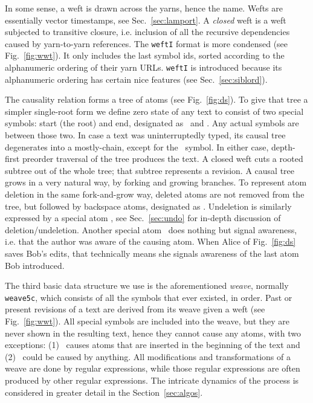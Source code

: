 \documentclass{sig-alternate}
\begin{document}
In some sense, a weft is drawn across the yarns, hence the name.
Wefts are essentially vector timestamps, see Sec.~\ref{sec:lamport}.
A \emph{closed} weft is a weft subjected to transitive closure, i.e. inclusion of all the recursive dependencies caused by yarn-to-yarn references.
The {\tt weftI} format is more condensed (see Fig.~\ref{fig:wwt}). It only includes the last symbol ids, sorted according to the alphanumeric ordering of their yarn URLs.
{\tt weftI} is introduced because its alphanumeric ordering has certain nice features  (see Sec.~\ref{sec:siblord}).

The causality relation forms a tree of atoms (see Fig.~\ref{fig:ds}).
To give that tree a simpler single-root form we define zero state of any text to consist of two special symbols: start (the root) and end, designated as \aum ~and \eoa.
Any actual symbols are between those two.
In case a text was uninterruptedly typed, its causal tree degenerates into a mostly-chain, except for the \eoa ~symbol.
In either case, depth-first preorder traversal of the tree produces the text.
A closed weft cuts a rooted subtree out of the whole tree; that subtree represents a revision.
A causal tree grows in a very natural way, by forking and growing branches.
To represent atom deletion in the same fork-and-grow way, deleted atoms are not removed from the tree, but followed by backspace atoms, designated as \bsp. 
Undeletion is similarly expressed by a special atom \cnc, see Sec.~\ref{sec:undo} for in-depth discussion of deletion/undeletion.
Another special atom \zero ~does nothing but signal awareness, i.e. that the author was aware of the causing atom. When Alice of Fig.~\ref{fig:ds} saves Bob's edits, that technically means she signals awareness of the last atom Bob introduced.

The third basic data structure we use is the aforementioned \emph{weave}, normally {\tt weave5c}, which consists of all the symbols that ever existed, in order. 
Past or present revisions of a text are derived from its weave given a weft (see Fig.~\ref{fig:wwt}).
All special symbols are included into the weave, but they are never shown in the resulting text, hence they cannot cause any atoms, with two exceptions: (1) \aum ~causes atoms that are inserted in the beginning of the text and (2) \zero ~could be caused by anything.
All modifications and transformations of a weave are done by regular expressions, while those regular expressions are often produced by other regular expressions.
The intricate dynamics of the process is considered in greater detail in the Section~\ref{sec:algos}.
\end{document}
